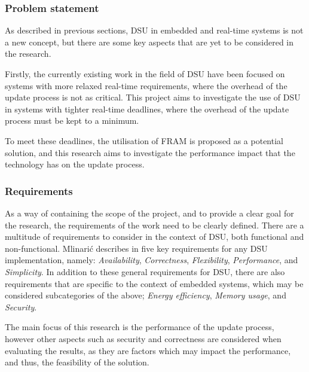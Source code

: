 \subsubsection*{Problem statement}
As described in previous sections, DSU in embedded and real-time systems is not a new concept, but there are some key aspects that are yet to be considered in the research. 

Firstly, the currently existing work in the field of DSU have been focused on systems with more relaxed real-time requirements, where the overhead of the update process is not as critical. This project aims to investigate the use of DSU in systems with tighter real-time deadlines, where the overhead of the update process must be kept to a minimum.

To meet these deadlines, the utilisation of FRAM is proposed as a potential solution, and this research aims to investigate the performance impact that the technology has on the update process.  

\subsubsection*{Requirements}
As a way of containing the scope of the project, and to provide a clear goal for the research, the requirements of the work need to be clearly defined. There are a multitude of requirements to consider in the context of DSU, both functional and non-functional. Mlinarić describes in \cite{dsuChallenges} five key requirements for any DSU implementation, namely: \textit{Availability}, \textit{Correctness}, \textit{Flexibility}, \textit{Performance}, and \textit{Simplicity}. In addition to these general requirements for DSU, there are also requirements that are specific to the context of embedded systems, which may be considered subcategories of the above; \textit{Energy efficiency}, \textit{Memory usage}, and \textit{Security}.

The main focus of this research is the performance of the update process, however other aspects such as security and correctness are considered when evaluating the results, as they are factors which may impact the performance, and thus, the feasibility of the solution.
